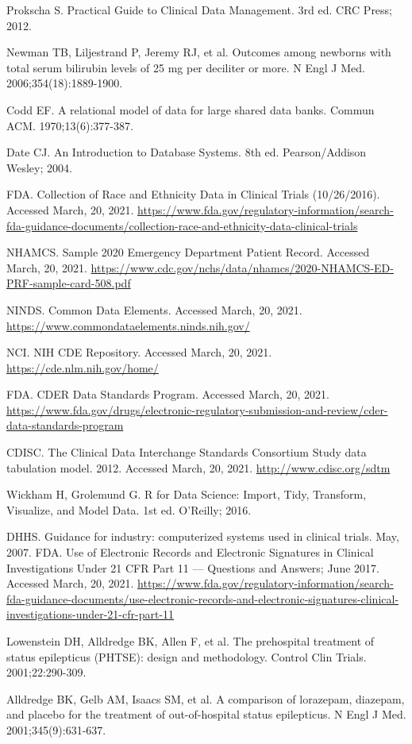 \begin{references}
\item Prokscha S. Practical Guide to Clinical Data Management. 3rd ed. CRC Press; 2012.
\item Newman TB, Liljestrand P, Jeremy RJ, et al. Outcomes among newborns with total serum bilirubin levels of 25 mg per deciliter or more. N Engl J Med. 2006;354(18):1889-1900.
\item Codd EF. A relational model of data for large shared data banks. Commun ACM. 1970;13(6):377-387.
\item Date CJ. An Introduction to Database Systems. 8th ed. Pearson/Addison Wesley; 2004.
\item FDA. Collection of Race and Ethnicity Data in Clinical Trials (10/26/2016). Accessed March, 20, 2021. \url{https://www.fda.gov/regulatory-information/search-fda-guidance-documents/collection-race-and-ethnicity-data-clinical-trials}
\item NHAMCS. Sample 2020 Emergency Department Patient Record. Accessed March, 20, 2021. \url{https://www.cdc.gov/nchs/data/nhamcs/2020-NHAMCS-ED-PRF-sample-card-508.pdf}
\item NINDS. Common Data Elements. Accessed March, 20, 2021. \url{https://www.commondataelements.ninds.nih.gov/}
\item NCI. NIH CDE Repository. Accessed March, 20, 2021. \url{https://cde.nlm.nih.gov/home/}
\item FDA. CDER Data Standards Program. Accessed March, 20, 2021. \url{https://www.fda.gov/drugs/electronic-regulatory-submission-and-review/cder-data-standards-program}
\item CDISC. The Clinical Data Interchange Standards Consortium Study data tabulation model. 2012. Accessed March, 20, 2021. \url{http://www.cdisc.org/sdtm}
\item Wickham H, Grolemund G. R for Data Science: Import, Tidy, Transform, Visualize, and Model Data. 1st ed. O’Reilly; 2016.
\item DHHS. Guidance for industry: computerized systems used in clinical trials. May, 2007. FDA. Use of Electronic Records and Electronic Signatures in Clinical Investigations Under 21 CFR Part 11 — Questions and Answers; June 2017. Accessed March, 20, 2021. \url{https://www.fda.gov/regulatory-information/search-fda-guidance-documents/use-electronic-records-and-electronic-signatures-clinical-investigations-under-21-cfr-part-11}
\item Lowenstein DH, Alldredge BK, Allen F, et al. The prehospital treatment of status epilepticus (PHTSE): design and methodology. Control Clin Trials. 2001;22:290-309.
\item Alldredge BK, Gelb AM, Isaacs SM, et al. A comparison of lorazepam, diazepam, and placebo for the treatment of out-of-hospital status epilepticus. N Engl J Med. 2001;345(9):631-637.
\end{references}

